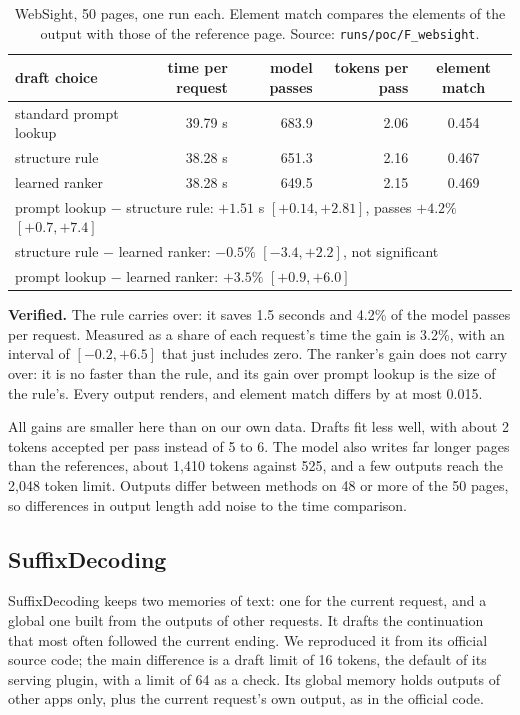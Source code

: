 \documentclass[10pt,a4paper]{article}
\begin{document}
\begin{table}[H]\centering\small
\caption{WebSight, 50 pages, one run each. Element match compares the elements of the output with those of the reference page. Source: \texttt{runs/poc/F\_websight}.}\label{tab:websight}
\begin{tabular}{lrrrc}
\toprule
draft choice & time per request & model passes & tokens per pass & element match\\
\midrule
standard prompt lookup & 39.79 s & 683.9 & 2.06 & 0.454\\
structure rule & 38.28 s & 651.3 & 2.16 & 0.467\\
learned ranker & 38.28 s & 649.5 & 2.15 & 0.469\\
\midrule
\multicolumn{5}{l}{prompt lookup $-$ structure rule: $+1.51$ s $[+0.14, +2.81]$, passes $+4.2\%$ $[+0.7, +7.4]$}\\
\multicolumn{5}{l}{structure rule $-$ learned ranker: $-0.5\%$ $[-3.4, +2.2]$, not significant}\\
\multicolumn{5}{l}{prompt lookup $-$ learned ranker: $+3.5\%$ $[+0.9, +6.0]$}\\
\bottomrule
\end{tabular}
\end{table}
\textbf{Verified.} The rule carries over: it saves 1.5 seconds and 4.2\% of the model passes per request. Measured as a share of each request's time the gain is 3.2\%, with an interval of $[-0.2, +6.5]$ that just includes zero. The ranker's gain does not carry over: it is no faster than the rule, and its gain over prompt lookup is the size of the rule's. Every output renders, and element match differs by at most 0.015.

All gains are smaller here than on our own data. Drafts fit less well, with about 2 tokens accepted per pass instead of 5 to 6. The model also writes far longer pages than the references, about 1,410 tokens against 525, and a few outputs reach the 2,048 token limit. Outputs differ between methods on 48 or more of the 50 pages, so differences in output length add noise to the time comparison.

\subsection{SuffixDecoding}
SuffixDecoding keeps two memories of text: one for the current request, and a global one built from the outputs of other requests. It drafts the continuation that most often followed the current ending. We reproduced it from its official source code; the main difference is a draft limit of 16 tokens, the default of its serving plugin, with a limit of 64 as a check. Its global memory holds outputs of other apps only, plus the current request's own output, as in the official code.
\end{document}
